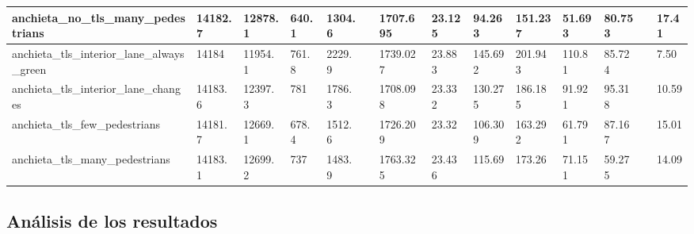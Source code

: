 \begin{table}
{\begin{tabular}{llllllllllllll}
    anchieta\_no\_tls\_many\_pedestrians                    & 14182.7                      & 12878.1                        & 640.1                            & 1304.6                          &  & 1707.695                         & 23.125                              & 94.263                             & 151.237                           & 51.693                           & 80.753                          &  & 17.41                             \\ \hline
    anchieta\_tls\_interior\_lane\_always\_green      & 14184                        & 11954.1                        & 761.8                            & 2229.9                          &  & 1739.027                         & 23.883                              & 145.692                            & 201.943                           & 110.81                           & 85.724                          &  & 7.50                              \\ \hline
    anchieta\_tls\_interior\_lane\_changes            & 14183.6                      & 12397.3                        & 781                              & 1786.3                          &  & 1708.098                         & 23.332                              & 130.275                            & 186.185                           & 91.921                           & 95.318                          &  & 10.59                             \\ \hline
    anchieta\_tls\_few\_pedestrians                & 14181.7                      & 12669.1                        & 678.4                            & 1512.6                          &  & 1726.209                         & 23.32                               & 106.309                            & 163.292                           & 61.791                           & 87.167                          &  & 15.01                             \\ \hline
    anchieta\_tls\_many\_pedestrians               & 14183.1                      & 12699.2                        & 737                              & 1483.9                          &  & 1763.325                         & 23.436                              & 115.69                             & 173.26                            & 71.151                           & 59.275                          &  & 14.09                             \\ \hline
    \end{tabular}}
\end{table}


\subsection{Análisis de los resultados}